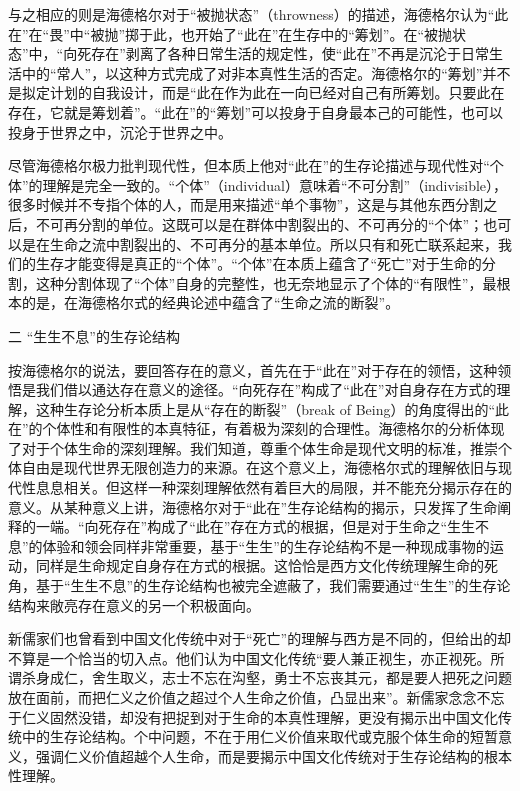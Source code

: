 \documentclass[UTF8, 12pt, a4paper]{ctexrep}
\begin{document}
与之相应的则是海德格尔对于“被抛状态”（throwness）的描述，海德格尔认为“此在”在“畏”中“被抛”掷于此，也开始了“此在”在生存中的“筹划”。在“被抛状态”中，“向死存在”剥离了各种日常生活的规定性，使“此在”不再是沉沦于日常生活中的“常人”，以这种方式完成了对非本真性生活的否定。海德格尔的“筹划”并不是拟定计划的自我设计，而是“此在作为此在一向已经对自己有所筹划。只要此在存在，它就是筹划着”。“此在”的“筹划”可以投身于自身最本己的可能性，也可以投身于世界之中，沉沦于世界之中。

尽管海德格尔极力批判现代性，但本质上他对“此在”的生存论描述与现代性对“个体”的理解是完全一致的。“个体”（individual）意味着“不可分割”（indivisible），很多时候并不专指个体的人，而是用来描述“单个事物”，这是与其他东西分割之后，不可再分割的单位。这既可以是在群体中割裂出的、不可再分的“个体”；也可以是在生命之流中割裂出的、不可再分的基本单位。所以只有和死亡联系起来，我们的生存才能变得是真正的“个体”。“个体”在本质上蕴含了“死亡”对于生命的分割，这种分割体现了“个体”自身的完整性，也无奈地显示了个体的“有限性”，最根本的是，在海德格尔式的经典论述中蕴含了“生命之流的断裂”。

二 “生生不息”的生存论结构

按海德格尔的说法，要回答存在的意义，首先在于“此在”对于存在的领悟，这种领悟是我们借以通达存在意义的途径。“向死存在”构成了“此在”对自身存在方式的理解，这种生存论分析本质上是从“存在的断裂”（break of Being）的角度得出的“此在”的个体性和有限性的本真特征，有着极为深刻的合理性。海德格尔的分析体现了对于个体生命的深刻理解。我们知道，尊重个体生命是现代文明的标准，推崇个体自由是现代世界无限创造力的来源。在这个意义上，海德格尔式的理解依旧与现代性息息相关。但这样一种深刻理解依然有着巨大的局限，并不能充分揭示存在的意义。从某种意义上讲，海德格尔对于“此在”生存论结构的揭示，只发挥了生命阐释的一端。“向死存在”构成了“此在”存在方式的根据，但是对于生命之“生生不息”的体验和领会同样非常重要，基于“生生”的生存论结构不是一种现成事物的运动，同样是生命规定自身存在方式的根据。这恰恰是西方文化传统理解生命的死角，基于“生生不息”的生存论结构也被完全遮蔽了，我们需要通过“生生”的生存论结构来敞亮存在意义的另一个积极面向。

新儒家们也曾看到中国文化传统中对于“死亡”的理解与西方是不同的，但给出的却不算是一个恰当的切入点。他们认为中国文化传统“要人兼正视生，亦正视死。所谓杀身成仁，舍生取义，志士不忘在沟壑，勇士不忘丧其元，都是要人把死之问题放在面前，而把仁义之价值之超过个人生命之价值，凸显出来”。新儒家念念不忘于仁义固然没错，却没有把捉到对于生命的本真性理解，更没有揭示出中国文化传统中的生存论结构。个中问题，不在于用仁义价值来取代或克服个体生命的短暂意义，强调仁义价值超越个人生命，而是要揭示中国文化传统对于生存论结构的根本性理解。
\end{document}
